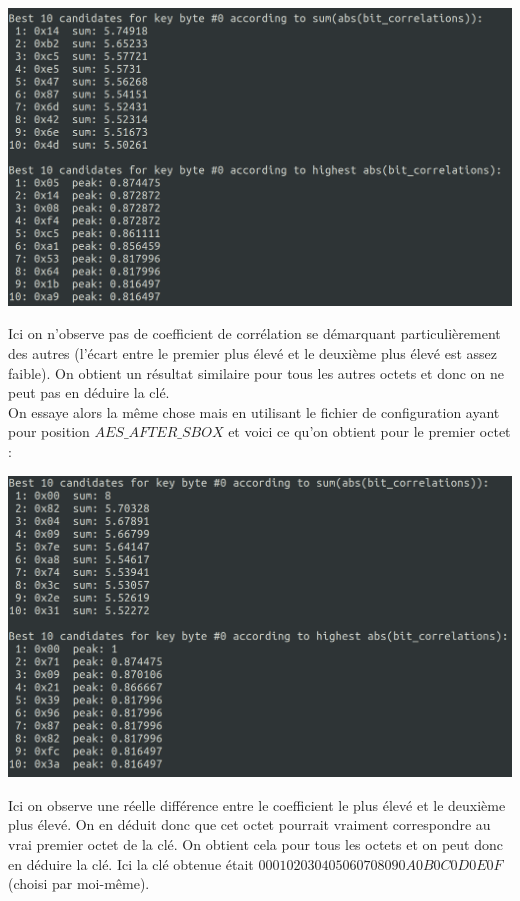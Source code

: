 \documentclass[10pt,a4paper]{article}
\begin{document}
\begin{center}
\includegraphics[scale=0.25]{Images/Resultat_AES_basique_echec}\\
\end{center}
Ici on n'observe pas de coefficient de corrélation se démarquant particulièrement des autres (l'écart entre le premier plus élevé et le deuxième plus élevé est assez faible). On obtient un résultat similaire pour tous les autres octets et donc on ne peut pas en déduire la clé.\\
On essaye alors la même chose mais en utilisant le fichier de configuration ayant pour position $AES\_AFTER\_SBOX$ et voici ce qu'on obtient pour le premier octet :

\begin{center}
\includegraphics[scale=0.25]{Images/Resultat_AES_basique_succes}\\
\end{center}
Ici on observe une réelle différence entre le coefficient le plus élevé et le deuxième plus élevé. On en déduit donc que cet octet pourrait vraiment correspondre au vrai premier octet de la clé. On obtient cela pour tous les octets et on peut donc en déduire la clé. Ici la clé obtenue était $000102030405060708090A0B0C0D0E0F$ (choisi par moi-même).
\end{document}
